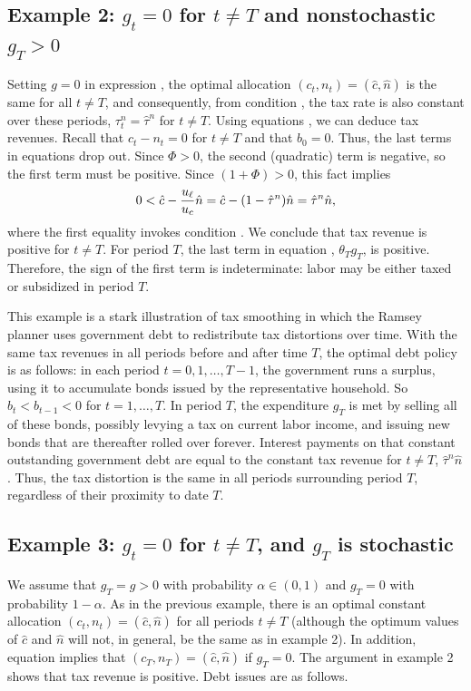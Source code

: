 \subsection{Example 2: $g_t=0$ for $t\not= T$ and nonstochastic $g_T>0$}
\label{sec:LucasStokey_ex2}%
Setting $g=0$ in expression , the optimal
allocation  $(c_t,n_t)=(\hat c, \hat n)$ is the same  for all $t\not= T$,
and consequently, from condition , the tax rate is also constant
over these periods, $\tau^n_t=\hat \tau^n$ for $t\not= T$. Using
equations , we can deduce tax revenues.
Recall that $c_t-n_t=0$ for $t\neq T$  and that $b_0=0$. Thus, the
last terms in equations 
drop out. Since $\Phi>0$, the second (quadratic) term is negative, so
the first term must be positive. Since $(1+\Phi)>0$, this fact implies
$$
0<\hat c - {u_{\ell} \over u_c} \hat n = \hat c - (1-\hat \tau^n) \hat n
 = \hat \tau^n \hat n,
$$
where the first equality invokes condition . We conclude that
tax revenue is positive for $t\not= T$. For period $T$, the last term
in equation , $\theta_T g_T$, is positive. Therefore, the sign
of the first term is indeterminate: labor may be either taxed or
subsidized in period $T$.

This example is a stark illustration of tax smoothing in which the Ramsey planner uses government  debt
to redistribute tax distortions over time. With the same tax
revenues in all periods before and after time $T$, the optimal debt
policy is as follows: in each period $t=0,1, \ldots ,T-1$, the government
runs a surplus, using it to accumulate  bonds issued by the representative household.
So $b_t < b_{t-1} < 0$ for $t = 1, \ldots , T$.
In period $T$, the expenditure $g_T$ is met by selling all of these
bonds, possibly levying a tax on current labor income, and issuing
new bonds that are thereafter rolled over forever. Interest payments
on that constant outstanding government debt are equal to the constant
tax revenue for $t\not= T$,
$\hat \tau^n \hat n$. Thus, the tax distortion is the same in all periods
surrounding period $T$, regardless of their proximity to  date $T$. %

\subsection{Example 3: $g_t=0$ for $t\not= T$, and $g_T$ is stochastic}
\label{sec:LucasStokey_ex3}%
We assume that $g_T=g>0$ with probability $\alpha \in (0,1)$ and $g_T=0$ with
probability $1-\alpha$.  As in the previous example, there is an
optimal constant allocation $(c_t,n_t)=(\hat c, \hat n)$ for all
periods $t\not= T$ (although the optimum values of $\hat c$ and
$\hat n$ will not, in general, be the same as in example 2). In addition,
equation  implies that $(c_T,n_T)=(\hat c, \hat n)$ if $g_T=0$.
The argument in example 2 shows that tax revenue is positive. Debt issues are as follows.

